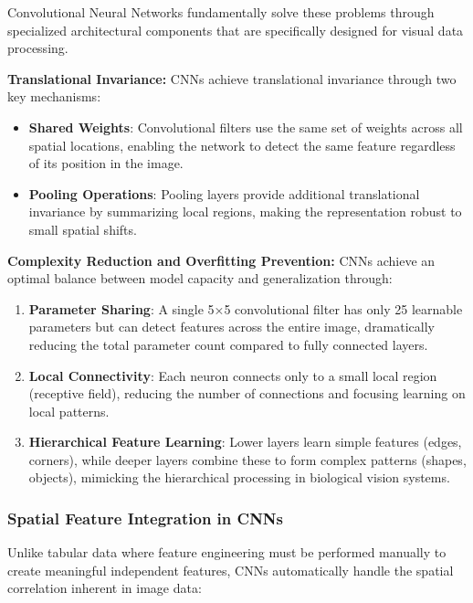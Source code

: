 \documentclass[a4paper, journal]{IEEEtran}
\begin{document}
Convolutional Neural Networks fundamentally solve these problems through specialized architectural components that are specifically designed for visual data processing.

\textbf{Translational Invariance:}
CNNs achieve translational invariance through two key mechanisms:
\begin{itemize}
    \item \textbf{Shared Weights}: Convolutional filters use the same set of weights across all spatial locations, enabling the network to detect the same feature regardless of its position in the image.
    \item \textbf{Pooling Operations}: Pooling layers provide additional translational invariance by summarizing local regions, making the representation robust to small spatial shifts.
\end{itemize}

\textbf{Complexity Reduction and Overfitting Prevention:}
CNNs achieve an optimal balance between model capacity and generalization through:

\begin{enumerate}
    \item \textbf{Parameter Sharing}: A single 5×5 convolutional filter has only 25 learnable parameters but can detect features across the entire image, dramatically reducing the total parameter count compared to fully connected layers.

    \item \textbf{Local Connectivity}: Each neuron connects only to a small local region (receptive field), reducing the number of connections and focusing learning on local patterns.

    \item \textbf{Hierarchical Feature Learning}: Lower layers learn simple features (edges, corners), while deeper layers combine these to form complex patterns (shapes, objects), mimicking the hierarchical processing in biological vision systems.
\end{enumerate}

\subsubsection{Spatial Feature Integration in CNNs}

Unlike tabular data where feature engineering must be performed manually to create meaningful independent features, CNNs automatically handle the spatial correlation inherent in image data:
\end{document}
